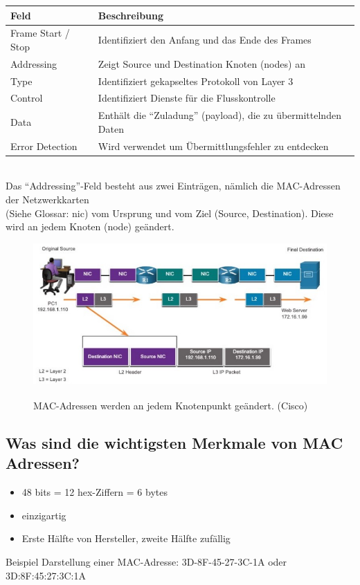 \begin{tabularx}{\textwidth}{lX}
    Feld&Beschreibung\\
    \hline
    Frame Start / Stop&Identifiziert den Anfang und das Ende des Frames\\
    Addressing&Zeigt Source und Destination Knoten (nodes) an\\
    Type&Identifiziert gekapseltes Protokoll von Layer 3\\
    Control&Identifiziert Dienste für die Flusskontrolle\\
    Data&Enthält die "`Zuladung"' (payload), die zu übermittelnden Daten\\
    Error Detection&Wird verwendet um Übermittlungsfehler zu entdecken\\
    \hline
\end{tabularx}\\

Das "`Addressing"'-Feld besteht aus zwei Einträgen, nämlich die MAC-Adressen der Netzwerkkarten\\
(Siehe Glossar: \acrshort{nic}) vom Ursprung und vom Ziel (Source, Destination). Diese wird an jedem Knoten (node) geändert.

\begin{figure}[H]
    \begin{center}
    \label{pic:DataLinkFrameAddresses}
    \includegraphics[width=\textwidth]{images/Data_Link_Frame_Addresses.jpg}
    \caption{MAC-Adressen werden an jedem Knotenpunkt geändert. (\textsuperscript{\textcopyright}Cisco)}
    \end{center}
\end{figure}

\pagebreak
\subsection*{Was sind die wichtigsten Merkmale von MAC Adressen?}
\begin{itemize}
    \item 48 bits = 12 hex-Ziffern = 6 bytes
    \item einzigartig
    \item Erste Hälfte von Hersteller, zweite Hälfte zufällig
\end{itemize}
Beispiel Darstellung einer MAC-Adresse: 3D-8F-45-27-3C-1A oder 3D:8F:45:27:3C:1A

